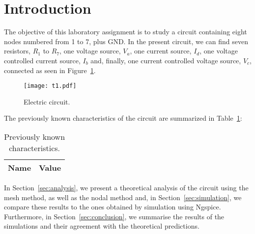 \section{Introduction}
\label{sec:introduction}

The objective of this laboratory assignment is to study a circuit containing eight nodes numbered from 1 to 7, plus GND. In the present circuit, we can find seven resistors, $R_1$ to $R_7$, one voltage source, $V_a$, one current source, $I_d$, one voltage controlled current source, $I_b$ and, finally, one current controlled voltage source, $V_c$, connected as seen in Figure~\ref{fig:t1}.

\begin{figure}[H] \centering
\texttt{[image: t1.pdf]}
\caption{Electric circuit.}
\label{fig:t1}
\end{figure}

The previously known characteristics of the circuit are summarized in Table~\ref{tab:datatab}:

\begin{table}[H]
  \centering
  \begin{tabular}{|l|r|}
    \hline    
    {\bf Name} & {\bf Value} \\ \hline
    
  \end{tabular}
  \caption{Previously known characteristics.}
  \label{tab:datatab}
\end{table}

In Section~\ref{sec:analysis}, we present a theoretical analysis of the circuit using the mesh method, as well as the nodal method and, in Section~\ref{sec:simulation}, we compare these results to the ones obtained by simulation using Ngspice. Furthermore, in Section~\ref{sec:conclusion}, we summarise the results of the simulations and their agreement with the theoretical predictions.
